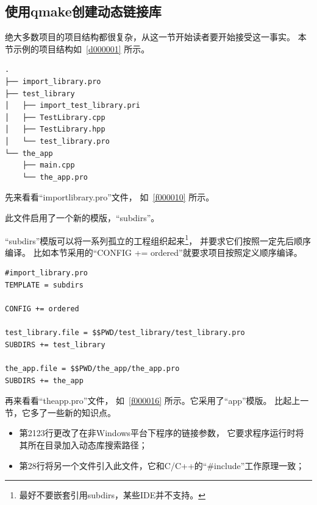 %
% 
\FloatBarrier
\subsection{
使用qmake创建动态链接库
}\label{ss000710}


绝大多数项目的项目结构都很复杂，从这一节开始读者要开始接受这一事实。
本节示例的项目结构如\treeindexnumbernameone\ \ref{d000001}
所示。

\FloatBarrier
{}\label{d000001}    %
\begin{lstlisting}[caption=GoodLuck,
numbers=none,
title=\treeindexnumbernameone \thetreeindexnumber
]
.
├── import_library.pro
├── test_library
│   ├── import_test_library.pri
│   ├── TestLibrary.cpp
│   ├── TestLibrary.hpp
│   └── test_library.pro
└── the_app
    ├── main.cpp
    └── the_app.pro
\end{lstlisting}          %


先来看看“import\underline{\hspace{0.5em}}library.pro”文件，
如\lstlistingname\ \ref{f000010}
所示。

此文件启用了一个新的模版，“subdirs”。

“subdirs”模版可以将一系列孤立的工程组织起来\footnote{
最好不要嵌套引用subdirs，某些IDE并不支持。
}，
并要求它们按照一定先后顺序编译。
比如本节采用的“CONFIG {\sourcefonttwo{}+}{\sourcefonttwo{}=} ordered”就要求项目按照定义顺序编译。

\FloatBarrier
\begin{lstlisting}[label=f000010,
caption=GoodLuck,
title=\lstlistingname\ \thelstlisting
]
#import_library.pro
TEMPLATE = subdirs

CONFIG += ordered

test_library.file = $$PWD/test_library/test_library.pro
SUBDIRS += test_library

the_app.file = $$PWD/the_app/the_app.pro
SUBDIRS += the_app
\end{lstlisting}          %


再来看看“the\underline{\hspace{0.5em}}app.pro”文件，
如\lstlistingname\ \ref{f000016} 所示。它采用了“app”模版。
比起上一节，它多了一些新的知识点。
\begin{itemize}
\item 第21\raisebox{0.16ex}{\sourcefonttwo\~{}}23行更改了在非Windows平台下程序的链接参数，
它要求程序运行时将其所在目录加入动态库搜索路径；
\item 第28行将另一个文件引入此文件，它和C/C{\sourcefonttwo{}+}{\sourcefonttwo{}+}的“{\sourcefonttwo\#}include”工作原理一致；
\end{itemize}

